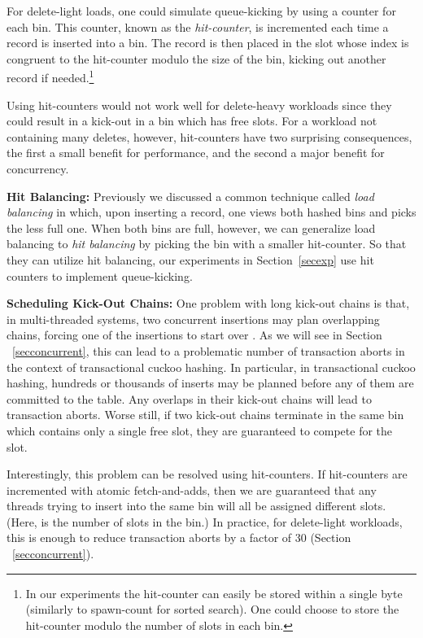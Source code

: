\documentclass{sig-alternate-05-2015}
\begin{document}
For delete-light loads, one could simulate queue-kicking by using a
counter for each bin. This counter, known as the \emph{hit-counter},
is incremented each time a record is inserted into a bin. The record
is then placed in the slot whose index is congruent to the hit-counter
modulo the size of the bin, kicking out another record if
needed.\footnote{In our experiments the hit-counter can easily be
  stored within a single byte (similarly to spawn-count for sorted
  search). One could choose to store the hit-counter modulo the number
  of slots in each bin.}

Using hit-counters would not work well for delete-heavy workloads
since they could result in a kick-out in a bin which has free
slots. For a workload not containing many deletes, however,
hit-counters have two surprising consequences, the first a small
benefit for performance, and the second a major benefit for concurrency.

\textbf{Hit Balancing: } Previously we discussed a common technique
called \emph{load balancing} in which, upon inserting a record, one
views both hashed bins and picks the less full one. When both
bins are full, however, we can generalize load balancing to
\emph{hit balancing} by picking the bin with a smaller
hit-counter. So that they can utilize hit balancing, our experiments
in Section~\ref{secexp} use hit counters to implement queue-kicking.

\textbf{Scheduling Kick-Out Chains: } One problem with long kick-out
chains is that, in multi-threaded systems, two concurrent insertions
may plan overlapping chains, forcing one of the insertions to start
over \cite{li14}. As we will see in Section ~\ref{secconcurrent}, this
can lead to a problematic number of transaction aborts in the context of
transactional cuckoo hashing. In particular, in transactional cuckoo
hashing, hundreds or thousands of inserts may be planned before any of
them are committed to the table. Any overlaps in their kick-out chains
will lead to transaction aborts. Worse still, if two kick-out chains
terminate in the same bin which contains only a single free slot, they
are guaranteed to compete for the slot.

  Interestingly, this problem can be resolved using hit-counters. If
  hit-counters are incremented with atomic fetch-and-adds, then we are
  guaranteed that any  threads trying to insert into the same bin
  will all be assigned different slots. (Here,  is the number of
  slots in the bin.) In practice, for delete-light workloads, this is
  enough to reduce transaction aborts by a factor of 30 (Section
 ~\ref{secconcurrent}).
\end{document}
